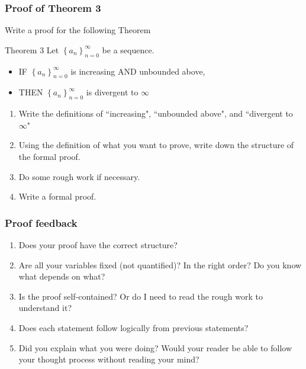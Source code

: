 \documentclass[14pt]{beamer}
\begin{document}
\begin{frame}[t]
	\fontsize{13}{13}\selectfont
	\frametitle{Proof of Theorem 3}
	Write a proof for the following Theorem
	\begin{block}{\fontsize{13}{13}\selectfont Theorem 3}
		Let $\displaystyle \left\{ a_{n} \right\}_{n=0}^{\infty}$ be a sequence.
		\begin{itemize}
			\item IF $\displaystyle \left\{ a_{n} \right\}_{n=0}^{\infty}$ is increasing
				AND unbounded above,

			\item THEN $\displaystyle \left\{ a_{n} \right\}_{n=0}^{\infty}$ is divergent
				to $\infty$
		\end{itemize}
	\end{block}
	\begin{enumerate}
		\item Write the definitions of ``increasing", ``unbounded above", and ``divergent
			to $\infty$"

		\item Using the definition of what you want to prove, write down the
			structure of the formal proof.

		\item Do some rough work if necessary.

		\item Write a formal proof.
	\end{enumerate}
\end{frame}

\begin{frame}[t]
	\frametitle{Proof feedback}

	\begin{enumerate}
		\item Does your proof have the correct structure?

		\item Are all your variables fixed (not quantified)? In the right order? Do you
			know what depends on what?

		\item Is the proof self-contained? Or do I need to read the rough work to
			understand it?

		\item Does each statement follow logically from previous statements?

		\item Did you explain what you were doing? Would your reader be able to
			follow your thought process without reading your mind?
	\end{enumerate}
\end{frame}
\end{document}
